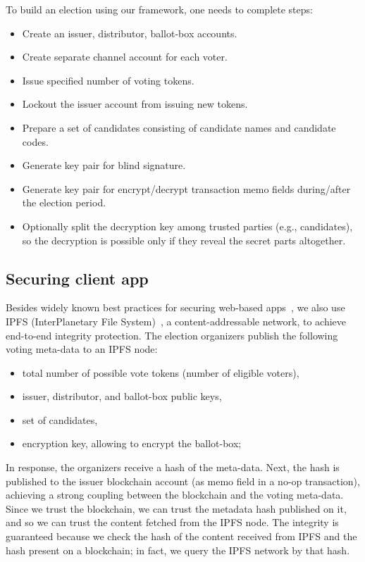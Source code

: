 \documentclass[applsci,article,submit,moreauthors,pdftex]{Definitions/mdpi}
\begin{document}
 
To build an election using our framework, one needs to complete steps:
\begin{samepage} 
\begin{itemize}
        \item Create an issuer, distributor, ballot-box accounts.
        \item Create separate channel account for each voter.
        \item Issue specified number of voting tokens.
        \item Lockout the issuer account from issuing new tokens.
        \item Prepare a set of candidates consisting of candidate names and candidate codes.
        \item Generate key pair for blind signature.
        \item Generate key pair for encrypt/decrypt  transaction memo fields during/after the election period.
       \item Optionally split the decryption key among trusted parties (e.g., candidates), so the decryption is possible only if they reveal the secret parts altogether.
\end{itemize}
\end{samepage}


\subsection{Securing client app}
Besides widely known best practices for securing web-based apps~\cite{Securing5:online}, we also use IPFS (InterPlanetary File System)~\cite{benet2014ipfs}, a content-addressable network, to achieve end-to-end integrity protection. The election organizers publish the following voting meta-data to an IPFS node:
\begin{itemize}
        \item total number of possible vote tokens (number of eligible voters),
        \item issuer, distributor, and ballot-box public keys,
        \item set of candidates,
        \item encryption key, allowing to encrypt the ballot-box;
\end{itemize}
In response, the organizers receive a hash of the meta-data. Next, the hash is published to the issuer blockchain account (as memo field in a no-op transaction), achieving a strong coupling between the blockchain and the voting meta-data. Since we trust the blockchain, we can trust the metadata hash published on it, and so we can trust the content fetched from the IPFS node. The integrity is guaranteed because we check the hash of the content received from IPFS and the hash present on a blockchain; in fact, we query the IPFS network by that hash.
\end{document}
